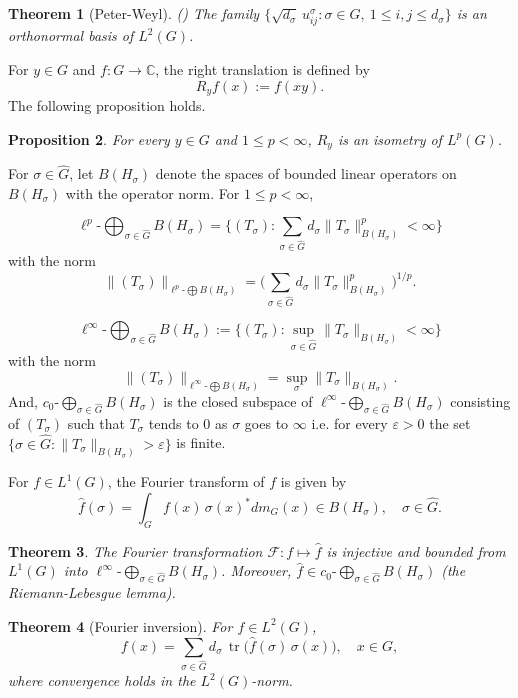 \documentclass[11pt]{amsart}
\newtheorem{theorem}{Theorem}[section]
\newtheorem{proposition}[theorem]{Proposition}
\def\petitoplus{\mathop{\bigoplus}}
\begin{document}
\begin{theorem}[Peter-Weyl](\cite[page 133]{Folland})
The family $\{\sqrt{d_\sigma}\,u^\sigma_{ij} : \sigma\in\widehat{G},\ 1\le i,j\le d_\sigma\}$
is an orthonormal basis of $L^2(G)$.
\end{theorem}

For $y\in G$ and $f:G\to\mathbb C$, the right translation  is defined by  $$R_yf(x):=f(xy).$$
The following proposition holds. 
\begin{proposition}\label{proposition:translation-isometry}
For every $y\in G$ and $1\le p<\infty$, $R_y$ is an isometry of $L^p(G)$.
\end{proposition}

For $\sigma\in\widehat{G}$, let $B(H_\sigma)$ denote the spaces of bounded linear operators on $B(H_\sigma)$ with the operator norm. For $1\le p<\infty$,  

$$\ell^p\text{-}\bigoplus_{\sigma\in\widehat{G}}B(H_\sigma)=\Big\{(T_\sigma):
\sum_{\sigma\in\widehat{G}}d_\sigma\|T_\sigma\|_{B(H_\sigma)}^p<\infty\Big\}$$
with the norm 
$$\|(T_\sigma)\|_{\ell^p\text{-}\bigoplus B(H_\sigma)}=\Big(\sum_{\sigma\in\widehat{G}}d_\sigma\|T_\sigma\|_{B(H_\sigma)}^p\Big)^{1/p}.$$

$$\ell^\infty\text{-}\bigoplus_{\sigma\in\widehat{G}}B(H_\sigma):=\Big\{(T_\sigma):
\sup_{\sigma\in\widehat{G}}\|T_\sigma\|_{B(H_\sigma)}<\infty\Big\}$$
with the norm
$$\|(T_\sigma)\|_{\ell^\infty\text{-}\bigoplus B(H_\sigma)}=\sup_\sigma\|T_\sigma\|_{B(H_\sigma)}.$$
And, 
 $c_0\text{-}\petitoplus\limits_{\sigma\in\widehat{G}}B(H_\sigma)$ is the closed subspace of
$\ell^\infty\text{-}\petitoplus\limits_{\sigma\in\widehat{G}} B(H_\sigma)$  consisting of   $(T_\sigma)$ such that 
$T_\sigma$ tends to $0$ as $\sigma$ goes to $\infty$  i.e. for every $\varepsilon>0$ the set
$\{\sigma\in \widehat{G}:\|T_\sigma\|_{B(H_\sigma)}>\varepsilon\}$ is finite.



For $f\in L^1(G)$, the Fourier transform of $f$ is given by
$$
\widehat f(\sigma)=\int_G f(x)\,\sigma(x)^*dm_G(x)\in B(H_\sigma),\quad\sigma\in\widehat{G}.
$$


\begin{theorem}
The Fourier transformation  $\mathscr{F}: f\mapsto\widehat f$ is injective and bounded from $L^1(G)$ into
$\ell^\infty\text{-}\petitoplus\limits_{\sigma \in \widehat{G}} B(H_\sigma)$. Moreover,    
$\widehat f\in c_0\text{-}\petitoplus\limits_{\sigma\in\widehat{G}}B(H_\sigma)$  (the Riemann-Lebesgue lemma).
\end{theorem}
\begin{theorem}[Fourier inversion]
For $f\in L^2(G)$,
\[
f(x)=\sum_{\sigma\in\widehat{G}}d_\sigma\,\operatorname{tr}\big(\widehat f(\sigma)\,\sigma(x)\big),
\quad x\in G,
\]
where convergence holds in the $L^2(G)$-norm.
\end{theorem}
\end{document}
